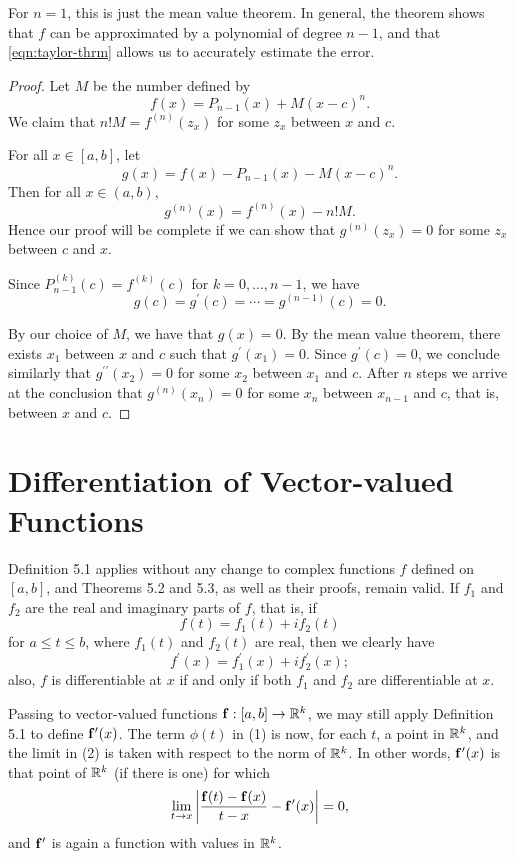 For $n=1$, this is just the mean value theorem. In general, the theorem shows that $f$ can be approximated by a polynomial of degree $n-1$, and that \eqref{eqn:taylor-thrm} allows us to accurately estimate the error.

\begin{proof}
Let $M$ be the number defined by
\[f(x)=P_{n-1}(x)+M(x-c)^n.\]
We claim that $n!M=f^{(n)}(z_x)$ for some $z_x$ between $x$ and $c$.

For all $x\in[a,b]$, let
\[g(x)=f(x)-P_{n-1}(x)-M(x-c)^n.\]
Then for all $x\in(a,b)$,
\[g^{(n)}(x)=f^{(n)}(x)-n!M.\]
Hence our proof will be complete if we can show that $g^{(n)}(z_x)=0$ for some $z_x$ between $c$ and $x$.

Since $P_{n-1}^{(k)}(c)=f^{(k)}(c)$ for $k=0,\dots,n-1$, we have
\[g(c)=g^\prime(c)=\cdots=g^{(n-1)}(c)=0.\]

By our choice of $M$, we have that $g(x)=0$. By the mean value theorem, there exists $x_1$ between $x$ and $c$ such that $g^\prime(x_1)=0$. Since $g^\prime(c)=0$, we conclude similarly that $g^{\prime\prime}(x_2)=0$ for some $x_2$ between $x_1$ and $c$. After $n$ steps we arrive at the conclusion that $g^{(n)}(x_n)=0$ for some $x_n$ between $x_{n-1}$ and $c$, that is, between $x$ and $c$.
\end{proof}
\pagebreak

\section{Differentiation of Vector-valued Functions}
Definition 5.1 applies without any change to complex functions
$f$ defined on $[a, b]$, and Theorems 5.2 and 5.3, as well as their proofs, remain valid. 
If $f_1$ and $f_2$ are the real and imaginary parts of $f$, that is, if
\[f(t)=f_1(t)+if_2(t)\]
for $a\le t\le b$, where $f_1(t)$ and $f_2(t)$ are real, then we clearly have
\[f^\prime(x)=f_1^\prime(x)+if_2^\prime(x);\]
also, $f$ is differentiable at $x$ if and only if both $f_1$ and $f_2$ are differentiable at $x$.

Passing to vector-valued functions $\vb{f}:[a,b]\to\mathbb R^k$, we may still apply Definition 5.1 to define $\vb{f}^\prime(x)$. The term $\phi(t)$ in (1) is now, for each $t$, a point in $\mathbb R^k$, and the limit in (2) is taken with respect to the norm of $\mathbb R^k$. In other words, $\vb{f}^\prime(x)$ is that point of $\mathbb R^k$ (if there is one) for which
\[\lim_{t\to x}\left|\frac{\vb{f}(t)-\vb{f}(x)}{t-x}-\vb{f}^\prime(x)\right|=0,\]
and $\vb{f}^\prime$ is again a function with values in $\mathbb R^k$.

